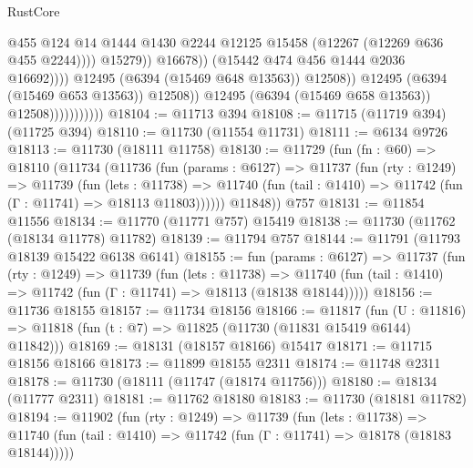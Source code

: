 \begin{lexlean}{RustCore}
\begin{coremodule}
                                                    @455
                                                    @124
                                                    @14
                                                    @1444
                                                    @1430
                                                    @2244
                                                    @12125
                                                    @15458
                                                    (@12267 (@12269 @636 @455 @2244))))
                                                @15279))
                                            @16678))
                                        (@15442 @474 @456 @1444 @2036 @16692))))
                                  @12495
                                  (@6394 (@15469 @648 @13563))
                                  @12508))
                              @12495
                              (@6394 (@15469 @653 @13563))
                              @12508))
                          @12495
                          (@6394 (@15469 @658 @13563))
                          @12508)))))))))))
@18104 := @11713 @394
@18108 := @11715 (@11719 @394) (@11725 @394)
@18110 := @11730 (@11554 @11731)
@18111 := @6134 @9726
@18113 := @11730 (@18111 @11758)
@18130 := @11729
    (fun (fn : @60) =>
    @18110
      (@11734
        (@11736
          (fun (params : @6127) =>
          @11737
            (fun (rty : @1249) =>
            @11739
              (fun (lets : @11738) =>
              @11740 (fun (tail : @1410) => @11742 (fun (Γ : @11741) => @18113 @11803))))))
        @11848))
    @757
@18131 := @11854 @11556
@18134 := @11770 (@11771 @757) @15419
@18138 := @11730 (@11762 (@18134 @11778) @11782)
@18139 := @11794 @757
@18144 := @11791 (@11793 @18139 @15422 @6138 @6141)
@18155 := fun (params : @6127) =>
  @11737
    (fun (rty : @1249) =>
    @11739
      (fun (lets : @11738) =>
      @11740 (fun (tail : @1410) => @11742 (fun (Γ : @11741) => @18113 (@18138 @18144)))))
@18156 := @11736 @18155
@18157 := @11734 @18156
@18166 := @11817
    (fun (U : @11816) => @11818 (fun (t : @7) => @11825 (@11730 (@11831 @15419 @6144) @11842)))
@18169 := @18131 (@18157 @18166) @15417
@18171 := @11715 @18156 @18166
@18173 := @11899 @18155 @2311
@18174 := @11748 @2311
@18178 := @11730 (@18111 (@11747 (@18174 @11756)))
@18180 := @18134 (@11777 @2311)
@18181 := @11762 @18180
@18183 := @11730 (@18181 @11782)
@18194 := @11902
    (fun (rty : @1249) =>
    @11739
      (fun (lets : @11738) =>
      @11740 (fun (tail : @1410) => @11742 (fun (Γ : @11741) => @18178 (@18183 @18144)))))

\end{coremodule}
\end{lexlean}
